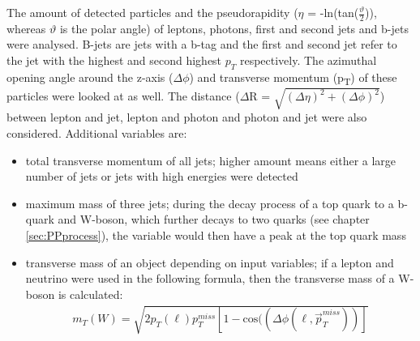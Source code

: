 \documentclass[11pt]{scrartcl}
\begin{document}
The amount of detected particles and the pseudorapidity ($\eta$ = -\textrm{ln}(\textrm{tan}($\frac{\vartheta}{2}$)), whereas $\vartheta$ is the polar angle) of leptons, photons, first and second jets and b-jets were analysed.  B-jets are jets with a b-tag and the first and second jet refer to the jet with the highest and second highest $p_T$ respectively. The azimuthal opening angle around the z-axis ($\Delta\phi$) and transverse momentum (p\textsubscript{T}) of these particles were looked at as well. The distance ($\Delta$R = $\sqrt{(\Delta\eta)^2 +(\Delta\phi)^2}$) between lepton and jet, lepton and photon and photon and jet were also considered. 
Additional variables are:
\begin{itemize}
  \item total transverse momentum of all jets; higher amount means either a large number of jets or jets with high energies were detected
  \item maximum mass of three jets; during the decay process of a top quark to a b-quark and W-boson, which further decays to two quarks (see chapter \ref{sec:PPprocess}), the variable would then have a peak at the top quark mass  
  \item transverse mass of an object depending on input variables; if a lepton and neutrino were used in the following formula, then the transverse mass of a W-boson is calculated:
	  \begin{align*}
			m_T(W) = \sqrt{2p_T(\ell)p_T^{miss}[1 - \textrm{cos}((\Delta\phi(\ell, \vec{p}_T^{miss}))]}
		\end{align*}
  

\end{itemize}
\end{document}
